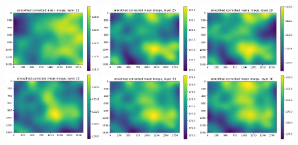 \documentclass[letterpaper,11pt]{article}
\begin{document}
\begin{figure}[!ht]
\centering
\includegraphics[width=0.32\textwidth]{images/results/smoothed_corrected_mean_image_layers_polaris/smoothed_corrected_mean_image_layer_21}
\includegraphics[width=0.32\textwidth]{images/results/smoothed_corrected_mean_image_layers_polaris/smoothed_corrected_mean_image_layer_25}
\includegraphics[width=0.32\textwidth]{images/results/smoothed_corrected_mean_image_layers_polaris/smoothed_corrected_mean_image_layer_29}
\includegraphics[width=0.32\textwidth]{images/results/smoothed_corrected_mean_image_layers_polaris/smoothed_corrected_mean_image_layer_30}
\includegraphics[width=0.32\textwidth]{images/results/smoothed_corrected_mean_image_layers_polaris/smoothed_corrected_mean_image_layer_33}
\includegraphics[width=0.32\textwidth]{images/results/smoothed_corrected_mean_image_layers_polaris/smoothed_corrected_mean_image_layer_36}

\end{figure}
\end{document}
